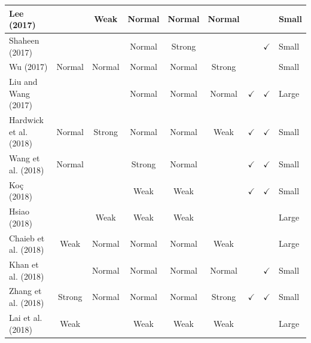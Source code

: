 \documentclass[../access.tex]{subfiles}
\begin{document}
\begin{table}[htbp]
\begin{adjustwidth}{-1cm}{}
\begin{tabular}{m{4.4cm} c c c c c c c >{\centering\arraybackslash}m{0.7cm}}
                    \hline
                    \footnotesize{Lee (2017) \cite{Lee2017}} & {} & {Weak} & {Normal} & {Normal} & {Normal} & {} & {} & \footnotesize{Small} \\
                    \hline
                    \footnotesize{Shaheen (2017) \cite{Shaheen2017}} & {} & {} & {Normal} & {Strong} & {} & {} & $ \checkmark $ & \footnotesize{Small} \\
                    \hline
                    \footnotesize{Wu (2017) \cite{Wu2017}} & {Normal} & {Normal} & {Normal} & {Normal} & {Strong} & {} & {} & \footnotesize{Small} \\
                    \hline
                    \footnotesize{Liu and Wang (2017) \cite{Liu2017}} & {} & {} & {Normal} & {Normal} & {Normal} & $ \checkmark $ & $ \checkmark $ & \footnotesize{Large} \\
                    \hline
                    \footnotesize{Hardwick et al. (2018) \cite{Hardwick2018}} & {Normal} & {Strong} & {Normal} & {Normal} & {Weak} & $ \checkmark $ & $ \checkmark $ & \footnotesize{Small} \\
                    \hline
                    \footnotesize{Wang et al. (2018) \cite{Wang2018}} & {Normal} & {} & {Strong} & {Normal} & {} & $ \checkmark $ & $ \checkmark $ & \footnotesize{Small} \\
                    \hline
                    \footnotesize{Ko\c{c} (2018) \cite{Koc2018}} & {} & {} & {Weak} & {Weak} & {} & $ \checkmark $ & $ \checkmark $ & \footnotesize{Small} \\
                    \hline
                    \footnotesize{Hsiao (2018) \cite{Hsiao2018}} & {} & {Weak} & {Weak} & {Weak} & {} & {} & {} & \footnotesize{Large} \\
                    \hline
                    \footnotesize{Chaieb et al. (2018) \cite{Chaieb2018}} & {Weak} & {Normal} & {Normal} & {Normal} & {Weak} & {} & {} & \footnotesize{Large} \\
                    \hline
                    \footnotesize{Khan et al. (2018) \cite{Khan2018}} & {} & {Normal} & {Normal} & {Normal} & {Normal} & {} & $ \checkmark $ & \footnotesize{Small} \\
                    \hline
                    \footnotesize{Zhang et al. (2018) \cite{Zhang2018}} & {Strong} & {Normal} & {Normal} & {Normal} & {Strong} & $ \checkmark $ & $ \checkmark $ & \footnotesize{Small} \\
                    \hline
                    \footnotesize{Lai et al. (2018) \cite{Lai2018}} & {Weak} & {} & {Weak} & {Weak} & {Weak} & {} & {} & \footnotesize{Large} \\

\end{tabular}
\end{adjustwidth}
\end{table}
\end{document}
